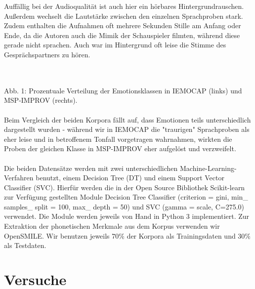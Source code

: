 \documentclass{article} %
\begin{document}
Auffällig bei der Audioqualität ist auch hier ein hörbares Hintergrundrauschen. Außerdem wechselt die Lautstärke zwischen den einzelnen Sprachproben stark. Zudem enthalten die Aufnahmen oft mehrere Sekunden Stille am Anfang oder Ende, da die Autoren auch die Mimik der Schauspieler filmten, während diese gerade nicht sprachen. Auch war im Hintergrund oft leise die Stimme des Gesprächspartners zu hören. \\ \\
 \\
Abb. 1: Prozentuale Verteilung der Emotionsklassen in IEMOCAP (links) und MSP-IMPROV (rechts). \\ \\
Beim Vergleich der beiden Korpora fällt auf, dass Emotionen teils unterschiedlich dargestellt wurden - während wir in IEMOCAP die "traurigen" Sprachproben als eher leise und in betroffenem Tonfall vorgetragen wahrnahmen, wirkten die Proben der gleichen Klasse in MSP-IMPROV eher aufgelöst und verzweifelt. \\ \\
Die beiden Datensätze werden mit zwei unterschiedlichen Machine-Learning-Verfahren benutzt, einem Decision Tree (DT) und einem Support Vector Classifier (SVC). Hierfür werden die in der Open Source Bibliothek Scikit-learn zur Verfügung gestellten Module Decision Tree Classifier (criterion = gini, min\_ samples\_ split = 100, max\_ depth = 50) und SVC (gamma = scale, C=275.0) verwendet. Die Module werden jeweils von Hand in Python 3 implementiert.  
Zur Extraktion der phonetischen Merkmale aus dem Korpus verwenden wir OpenSMILE. Wir benutzen jeweils 70\% der Korpora als Trainingsdaten und 30\% als Testdaten. 
\section{Versuche}
\end{document}
